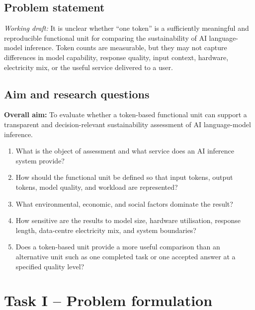 \documentclass[11pt,a4paper]{article}
\begin{document}
\subsection{Problem statement}
\textit{Working draft:} It is unclear whether ``one token'' is a sufficiently
meaningful and reproducible functional unit for comparing the sustainability of
AI language-model inference. Token counts are measurable, but they may not
capture differences in model capability, response quality, input context,
hardware, electricity mix, or the useful service delivered to a user.

\subsection{Aim and research questions}
\textbf{Overall aim:} To evaluate whether a token-based functional unit can
support a transparent and decision-relevant sustainability assessment of AI
language-model inference.

\begin{enumerate}[leftmargin=*]
    \item What is the object of assessment and what service does an AI inference
    system provide?
    \item How should the functional unit be defined so that input tokens, output
    tokens, model quality, and workload are represented?
    \item What environmental, economic, and social factors dominate the result?
    \item How sensitive are the results to model size, hardware utilisation,
    response length, data-centre electricity mix, and system boundaries?
    \item Does a token-based unit provide a more useful comparison than an
    alternative unit such as one completed task or one accepted answer at a
    specified quality level?
\end{enumerate}

\section{Task I -- Problem formulation}
\end{document}
